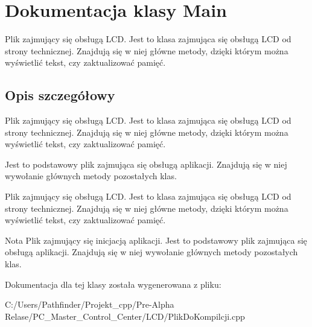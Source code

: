 \hypertarget{class_main}{}\section{Dokumentacja klasy Main}
\label{class_main}


Plik zajmujący się obsługą L\+CD. Jest to klasa zajmująca się obsługą L\+CD od strony technicznej. Znajdują się w niej główne metody, dzięki którym można wyświetlić tekst, czy zaktualizować pamięć.  




\subsection{Opis szczegółowy}
Plik zajmujący się obsługą L\+CD. Jest to klasa zajmująca się obsługą L\+CD od strony technicznej. Znajdują się w niej główne metody, dzięki którym można wyświetlić tekst, czy zaktualizować pamięć. 

Jest to podstawowy plik zajmująca się obsługą aplikacji. Znajdują się w niej wywołanie głównych metody pozostałych klas.

Plik zajmujący się obsługą L\+CD. Jest to klasa zajmująca się obsługą L\+CD od strony technicznej. Znajdują się w niej główne metody, dzięki którym można wyświetlić tekst, czy zaktualizować pamięć.

\begin{DoxyNote}{Nota}
Plik zajmujący się inicjacją aplikacji. Jest to podstawowy plik zajmująca się obsługą aplikacji. Znajdują się w niej wywołanie głównych metody pozostałych klas. 
\end{DoxyNote}


Dokumentacja dla tej klasy została wygenerowana z pliku\+:\begin{DoxyCompactItemize}
\item 
C\+:/\+Users/\+Pathfinder/\+Projekt\+\_\+cpp/\+Pre-\/\+Alpha Relase/\+P\+C\+\_\+\+Master\+\_\+\+Control\+\_\+\+Center/\+L\+C\+D/Plik\+Do\+Kompilcji.\+cpp\end{DoxyCompactItemize}
